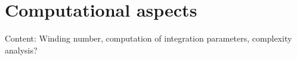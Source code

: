 \documentclass[main.tex]{subfiles}
\begin{document}
  \section{Computational aspects}

  Content: Winding number, computation of integration parameters, complexity analysis?

  
\end{document}
